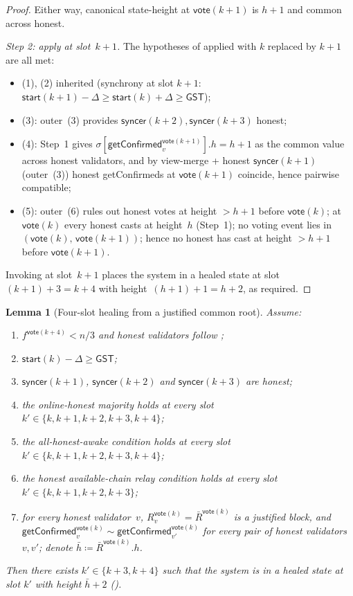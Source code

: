 \documentclass{article}
\newcommand{\syncer}{\mathsf{syncer}}
\newcommand{\start}{\mathsf{start}}
\newcommand{\vote}{\mathsf{vote}}
\newcommand{\comm}[1]{\bar{#1}}
\newcommand{\getConfirmed}{\textsf{getConfirmed}\xspace}
\theoremstyle{plain}
\newtheorem{lemma}{Lemma}
\theoremstyle{definition}
\theoremstyle{remark}
\newcommand{\GST}{\ensuremath{\mathsf{GST}}}
\newcommand{\OHM}{online-honest majority\xspace}
\newcommand{\HAR}{honest available-chain relay\xspace}
\newcommand{\AHA}{all-honest-awake\xspace}
\begin{document}
\begin{proof}
Either way, canonical state-height at $\vote(k+1)$ is $h+1$ and common across honest.

\emph{Step 2: apply  at slot~$k+1$.}
The hypotheses of  applied with $k$ replaced by $k+1$ are all met:
\begin{itemize}
  \item (1), (2) inherited (synchrony at slot $k+1$: $\start(k+1) - \Delta \geq \start(k) + \Delta \geq \GST$);
  \item (3): outer~(3) provides $\syncer(k+2), \syncer(k+3)$ honest;
  \item (4): Step~1 gives $\sigma[\getConfirmed_v^{\vote(k+1)}].h = h + 1$ as the common value across honest validators, and by view-merge + honest $\syncer(k+1)$ (outer~(3)) honest \getConfirmed{}s at $\vote(k+1)$ coincide, hence pairwise compatible;
  \item (5): outer~(6) rules out honest votes at height $>h+1$ before $\vote(k)$; at $\vote(k)$ every honest casts at height~$h$ (Step~1); no voting event lies in $(\vote(k),\, \vote(k+1))$; hence no honest has cast at height $>h+1$ before $\vote(k+1)$.
\end{itemize}
Invoking  at slot~$k+1$ places the system in a healed state at slot~$(k+1)+3 = k+4$ with height~$(h+1)+1 = h+2$, as required.
\end{proof}

\begin{lemma}[Four-slot healing from a justified common root]\label{rev:lem:healing-four-slot-from-justified}
Assume:
\begin{enumerate}
  \item $f^{\vote(k+4)} < n/3$ and honest validators follow ;
  \item $\start(k) - \Delta \geq \GST$;
  \item $\syncer(k+1)$, $\syncer(k+2)$ and $\syncer(k+3)$ are honest;
  \item the \OHM holds at every slot $k' \in \{k, k+1, k+2, k+3, k+4\}$;
  \item the \AHA condition holds at every slot $k' \in \{k, k+1, k+2, k+3, k+4\}$;
  \item the \HAR condition holds at every slot $k' \in \{k, k+1, k+2, k+3\}$;
  \item for every honest validator~$v$, $R_v^{\vote(k)} = \comm{R}^{\vote(k)}$ is a justified block, and $\getConfirmed_v^{\vote(k)} \sim \getConfirmed_{v'}^{\vote(k)}$ for every pair of honest validators~$v, v'$; denote $\comm{h} \coloneqq \comm{R}^{\vote(k)}.h$.
\end{enumerate}
Then there exists $k' \in \{k+3, k+4\}$ such that the system is in a healed state at slot $k'$ with height $\comm{h}+2$ ().
\end{lemma}
\end{document}
